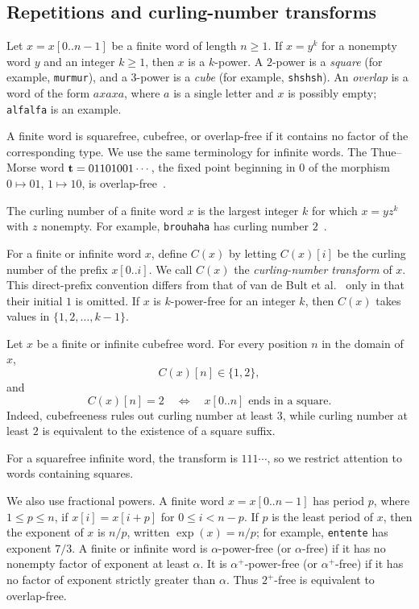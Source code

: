\documentclass[12pt,reqno]{article}
\begin{document}
\subsection{Repetitions and curling-number transforms}

Let $x=x[0..n-1]$ be a finite word of length $n\geq 1$.  If $x=y^k$ for a nonempty word $y$ and an integer $k\geq 1$, then $x$ is a $k$-power.  A $2$-power is a {\it square} (for example, {\tt murmur}), and a $3$-power is a {\it cube} (for example, {\tt shshsh}).  An {\it overlap} is a word of the form $axaxa$, where $a$ is a single letter and $x$ is possibly empty; {\tt alfalfa} is an example.

A finite word is squarefree, cubefree, or overlap-free if it contains no factor of the corresponding type.  We use the same terminology for infinite words.  The Thue--Morse word ${\bf t}=01101001\cdots$, the fixed point beginning in $0$ of the morphism $0\mapsto01$, $1\mapsto10$, is overlap-free~\cite{Thue:1912}.

The curling number of a finite word $x$ is the largest integer $k$ for which $x=yz^k$ with $z$ nonempty.  For example, {\tt brouhaha} has curling number $2$~\cite{Bult,Chaffin}.

For a finite or infinite word $x$, define $C(x)$ by letting $C(x)[i]$ be the curling number of the prefix $x[0..i]$.  We call $C(x)$ the {\it curling-number transform} of $x$.  This direct-prefix convention differs from that of van de Bult et al.~\cite{Bult} only in that their initial $1$ is omitted.  If $x$ is $k$-power-free for an integer $k$, then $C(x)$ takes values in $\{1,2,\ldots,k-1\}$.

\begin{remark}
\label{rem:cubefree-curl}
Let $x$ be a finite or infinite cubefree word. For every position $n$ in the domain of $x$,
\[
C(x)[n]\in\{1,2\},
\]
and
\[
C(x)[n]=2
\quad\Longleftrightarrow\quad
x[0..n]\text{ ends in a square}.
\]
Indeed, cubefreeness rules out curling number at least $3$, while curling number at least $2$ is equivalent to the existence of a square suffix.
\end{remark}

For a squarefree infinite word, the transform is $111\cdots$, so we restrict attention to words containing squares.

We also use fractional powers.  A finite word $x=x[0..n-1]$ has period $p$, where $1\leq p\leq n$, if $x[i]=x[i+p]$ for $0\leq i<n-p$.  If $p$ is the least period of $x$, then the exponent of $x$ is $n/p$, written $\exp(x)=n/p$; for example, {\tt entente} has exponent $7/3$.  A finite or infinite word is $\alpha$-power-free (or $\alpha$-free) if it has no nonempty factor of exponent at least $\alpha$.  It is $\alpha^+$-power-free (or $\alpha^+$-free) if it has no factor of exponent strictly greater than $\alpha$.  Thus $2^+$-free is equivalent to overlap-free.
\end{document}
